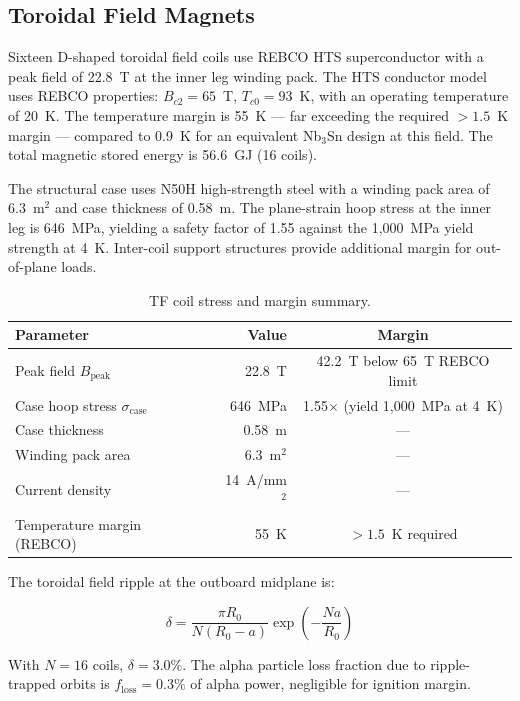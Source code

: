 \documentclass[11pt,a4paper]{article}
\begin{document}
\subsection{Toroidal Field Magnets}

Sixteen D-shaped toroidal field coils use REBCO HTS superconductor with a peak field of 22.8~T at the inner leg winding pack. The HTS conductor model uses REBCO properties: $B_{c2} = 65$~T, $T_{c0} = 93$~K, with an operating temperature of 20~K. The temperature margin is 55~K --- far exceeding the required $> 1.5$~K margin --- compared to 0.9~K for an equivalent Nb$_3$Sn design at this field. The total magnetic stored energy is 56.6~GJ (16 coils).

The structural case uses N50H high-strength steel with a winding pack area of 6.3~m$^2$ and case thickness of 0.58~m. The plane-strain hoop stress at the inner leg is 646~MPa, yielding a safety factor of 1.55 against the 1,000~MPa yield strength at 4~K. Inter-coil support structures provide additional margin for out-of-plane loads.

\begin{table}[htbp]
\centering
\caption{TF coil stress and margin summary.}
\label{tab:tf}
\begin{tabular}{lrc}
\toprule
Parameter & Value & Margin \\
\midrule
Peak field $B_{\text{peak}}$ & 22.8~T & 42.2~T below 65~T REBCO limit \\
Case hoop stress $\sigma_{\text{case}}$ & 646~MPa & 1.55$\times$ (yield 1,000~MPa at 4~K) \\
Case thickness & 0.58~m & --- \\
Winding pack area & 6.3~m$^2$ & --- \\
Current density & 14~A/mm$^2$ & --- \\
Temperature margin (REBCO) & 55~K & $> 1.5$~K required \\
\bottomrule
\end{tabular}
\end{table}

The toroidal field ripple at the outboard midplane is:

\begin{equation}
\delta = \frac{\pi R_0}{N (R_0 - a)} \exp\left(-\frac{N a}{R_0}\right)
\label{eq:ripple}
\end{equation}

With $N = 16$ coils, $\delta = 3.0\%$. The alpha particle loss fraction due to ripple-trapped orbits is $f_{\text{loss}} = 0.3\%$ of alpha power, negligible for ignition margin.
\end{document}
